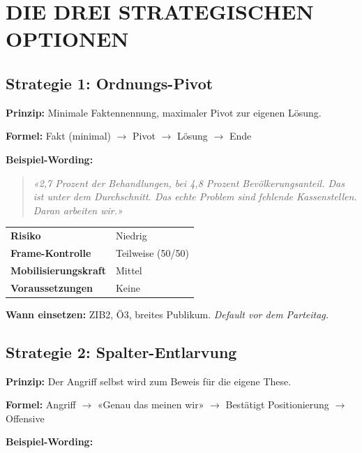 \documentclass[11pt,a4paper]{article}
\begin{document}
\newpage


\section{DIE DREI STRATEGISCHEN OPTIONEN}

\subsection{Strategie 1: Ordnungs-Pivot}

\textbf{Prinzip:} Minimale Faktennennung, maximaler Pivot zur eigenen Lösung.

\textbf{Formel:} Fakt (minimal) $\rightarrow$ Pivot $\rightarrow$ Lösung $\rightarrow$ Ende

\textbf{Beispiel-Wording:}

\begin{quote}
\textit{«2,7 Prozent der Behandlungen, bei 4,8 Prozent Bevölkerungsanteil. Das ist unter dem Durchschnitt. Das echte Problem sind fehlende Kassenstellen. Daran arbeiten wir.»}
\end{quote}

\begin{tabular}{@{}L{4cm} L{6cm}@{}}
\textbf{Risiko} & Niedrig \\
\textbf{Frame-Kontrolle} & Teilweise (50/50) \\
\textbf{Mobilisierungskraft} & Mittel \\
\textbf{Voraussetzungen} & Keine \\
\end{tabular}

\textbf{Wann einsetzen:} ZIB2, Ö3, breites Publikum. \textit{Default vor dem Parteitag.}

\subsection{Strategie 2: Spalter-Entlarvung}

\textbf{Prinzip:} Der Angriff selbst wird zum Beweis für die eigene These.

\textbf{Formel:} Angriff $\rightarrow$ «Genau das meinen wir» $\rightarrow$ Bestätigt Positionierung $\rightarrow$ Offensive

\textbf{Beispiel-Wording:}
\end{document}
